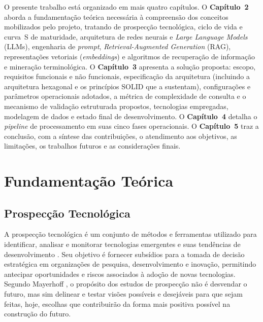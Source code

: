 \documentclass[12pt, a4paper]{article}
\begin{document}
  O presente trabalho está organizado em mais quatro capítulos. O
\textbf{Capítulo~2} aborda a fundamentação teórica necessária à compreensão dos conceitos mobilizados pelo projeto, tratando de prospecção tecnológica, ciclo de vida e curva~S de maturidade, arquitetura de redes neurais e \textit{Large Language Models} (LLMs), engenharia de \textit{prompt}, \textit{Retrieval-Augmented Generation} (RAG), representações vetoriais (\textit{embeddings}) e algoritmos de recuperação de informação e mineração terminológica. O \textbf{Capítulo~3} apresenta
a solução proposta: escopo, requisitos funcionais e não funcionais, especificação
da arquitetura (incluindo a arquitetura hexagonal e os princípios SOLID que a
sustentam), configurações e parâmetros operacionais adotados, a métrica de complexidade de
consulta e o mecanismo de validação estruturada propostos, tecnologias empregadas, modelagem de dados e
estado final de desenvolvimento. O \textbf{Capítulo~4} detalha o
\textit{pipeline} de processamento em suas cinco fases operacionais. O \textbf{Capítulo~5}
traz a conclusão, com a síntese das contribuições, o atendimento aos
objetivos, as limitações, os trabalhos futuros e as considerações finais.

\section{Fundamentação Teórica}

  \subsection{Prospecção Tecnológica}

  A prospecção tecnológica é um conjunto de métodos e ferramentas utilizado para
identificar, analisar e monitorar tecnologias emergentes e suas tendências de
desenvolvimento \cite{porter2004}. Seu objetivo é fornecer subsídios para a tomada
de decisão estratégica em organizações de pesquisa, desenvolvimento e inovação,
permitindo antecipar oportunidades e riscos associados à adoção de novas
tecnologias. Segundo Mayerhoff \cite{mayerhoff2008}, o propósito dos estudos de
prospecção não é desvendar o futuro, mas sim delinear e testar visões possíveis
e desejáveis para que sejam feitas, hoje, escolhas que contribuirão da forma mais
positiva possível na construção do futuro.
\end{document}
